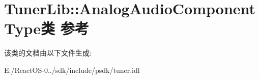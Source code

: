 \hypertarget{class_tuner_lib_1_1_analog_audio_component_type}{}\section{Tuner\+Lib\+:\+:Analog\+Audio\+Component\+Type类 参考}
\label{class_tuner_lib_1_1_analog_audio_component_type}


该类的文档由以下文件生成\+:\begin{DoxyCompactItemize}
\item 
E\+:/\+React\+O\+S-\/0../sdk/include/psdk/tuner.\+idl\end{DoxyCompactItemize}
